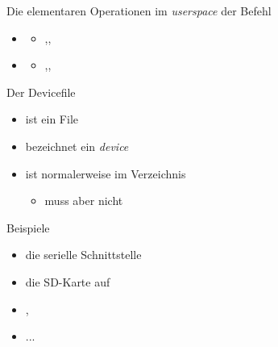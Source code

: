 \begin{frame}{Die elementaren Operationen im {\em userspace}}
             {der Befehl }
  \begin{itemize}
   \item {}
   \begin{itemize}
    \item {},,
   \end{itemize}
   \item {}
   \begin{itemize}
    \item {},,
   \end{itemize}
  \end{itemize}
\end{frame}

\begin{frame}{Der Devicefile }
 \begin{itemize}
  \item ist ein File
  \item bezeichnet ein {\em device}
  \item ist normalerweise im Verzeichnis 
  \begin{itemize}
   \item muss aber nicht 
  \end{itemize}
 \end{itemize}
 \begin{block}{Beispiele}
  \begin{itemize}
   \item {} die serielle Schnittstelle
   \item {} die SD-Karte auf \target
   \item {}, 
   \item ...
  \end{itemize}
 \end{block}
\end{frame}


